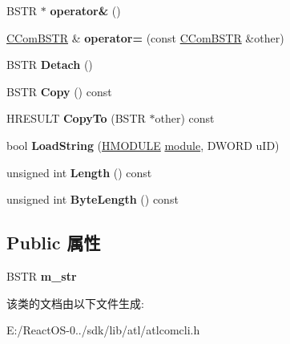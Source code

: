 \begin{DoxyCompactItemize}
B\+S\+TR $\ast$ {\bfseries operator\&} ()
\item 
\mbox{\label{class_a_t_l_1_1_c_com_b_s_t_r_a82a89547194c3ec3f25b089643691238}} 
\hyperlink{class_a_t_l_1_1_c_com_b_s_t_r}{C\+Com\+B\+S\+TR} \& {\bfseries operator=} (const \hyperlink{class_a_t_l_1_1_c_com_b_s_t_r}{C\+Com\+B\+S\+TR} \&other)
\item 
\mbox{\label{class_a_t_l_1_1_c_com_b_s_t_r_a44682a147c14c9a3cecdcc34e0a37467}} 
B\+S\+TR {\bfseries Detach} ()
\item 
\mbox{\label{class_a_t_l_1_1_c_com_b_s_t_r_ab7bd501d53122274cae97d10d114d3bf}} 
B\+S\+TR {\bfseries Copy} () const
\item 
\mbox{\label{class_a_t_l_1_1_c_com_b_s_t_r_a90802e54954bb1b20817a4c1551f76af}} 
H\+R\+E\+S\+U\+LT {\bfseries Copy\+To} (B\+S\+TR $\ast$other) const
\item 
\mbox{\label{class_a_t_l_1_1_c_com_b_s_t_r_af684460c4227ef14473e457b8ecaba82}} 
bool {\bfseries Load\+String} (\hyperlink{interfacevoid}{H\+M\+O\+D\+U\+LE} \hyperlink{structmodule}{module}, D\+W\+O\+RD u\+ID)
\item 
\mbox{\label{class_a_t_l_1_1_c_com_b_s_t_r_a8523fea948b27a784fe95ebab8012134}} 
unsigned int {\bfseries Length} () const
\item 
\mbox{\label{class_a_t_l_1_1_c_com_b_s_t_r_ac2525431643c1669ad7f09e73cd5180f}} 
unsigned int {\bfseries Byte\+Length} () const
\end{DoxyCompactItemize}
\subsection*{Public 属性}
\begin{DoxyCompactItemize}
\item 
\mbox{\label{class_a_t_l_1_1_c_com_b_s_t_r_a63776f705f3d2f20e2d86ee9f76e91bc}} 
B\+S\+TR {\bfseries m\+\_\+str}
\end{DoxyCompactItemize}


该类的文档由以下文件生成\+:\begin{DoxyCompactItemize}
\item 
E\+:/\+React\+O\+S-\/0../sdk/lib/atl/atlcomcli.\+h\end{DoxyCompactItemize}
